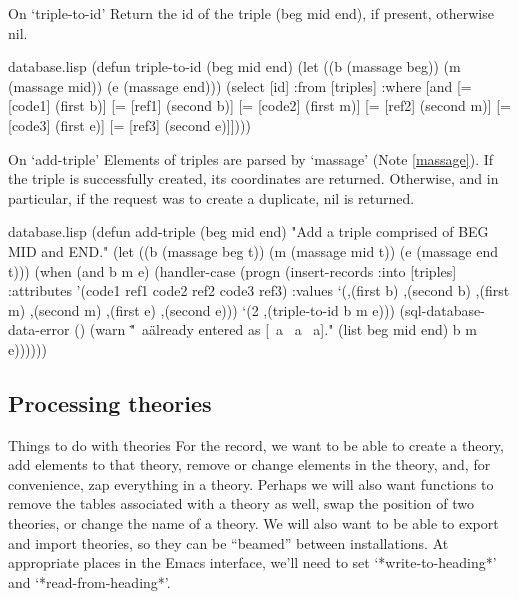 \begin{notate}{On `triple-to-id'}
Return the id of the triple (beg mid end),
if present, otherwise nil.
\end{notate}

\begin{common}{database.lisp}
(defun triple-to-id (beg mid end)
  (let ((b (massage beg))
        (m (massage mid))
        (e (massage end)))
    (select [id]
            :from [triples]
            :where [and [= [code1] (first b)]
                        [= [ref1] (second b)]
                        [= [code2] (first m)]
                        [= [ref2] (second m)]
                        [= [code3] (first e)]
                        [= [ref3] (second e)]])))
\end{common}

\begin{notate}{On `add-triple'} \label{add-triple}
Elements of triples are parsed by `massage'
(Note \ref{massage}).  If the triple
is successfully created, its coordinates are returned.
Otherwise, and in particular, if the request was to create
a duplicate, nil is returned.
\end{notate}

\begin{common}{database.lisp}
(defun add-triple (beg mid end)
  "Add a triple comprised of BEG MID and END."
  (let ((b (massage beg t))
        (m (massage mid t))
        (e (massage end t)))
    (when (and b m e)
      (handler-case
       (progn
         (insert-records
          :into [triples] :attributes '(code1 ref1
                                        code2 ref2
                                        code3 ref3)
          :values `(,(first b) ,(second b)
                    ,(first m) ,(second m)
                    ,(first e) ,(second e)))
         `(2 ,(triple-to-id b m e)))
       (sql-database-data-error ()
         (warn "\"~a\" already entered as [~a ~a ~a]."
               (list beg mid end) b m e))))))
\end{common}

\subsection*{Processing theories} \label{processing-theories}

\begin{notate}{Things to do with theories}
For the record, we want to be able to create a theory, add
elements to that theory, remove or change elements in the
theory, and, for convenience, zap everything in a theory.
Perhaps we will also want functions to remove the tables
associated with a theory as well, swap the position of two
theories, or change the name of a theory.  We will also
want to be able to export and import theories, so they can
be ``beamed'' between installations.  At appropriate
places in the Emacs interface, we'll need to set
`*write-to-heading*' and `*read-from-heading*'.
\end{notate}

